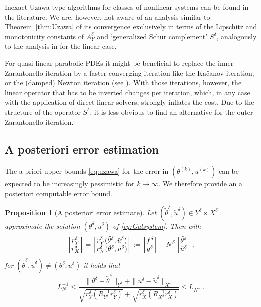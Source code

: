 \documentclass{amsart}
\newtheorem{proposition}[theorem]{Proposition}
\numberwithin{equation}{section}
\newcommand{\NN}{N}
\newcommand{\1}{\mathbb 1}
\begin{document}
\begin{remark} Inexact Uzawa type algorithms for classes of nonlinear systems can be found in the literature. We are, however, not aware of an analysis similar to Theorem~\ref{thm:Uzawa} of its convergence exclusively in terms of the Lipschitz and monotonicity constants of $A_Y^\delta$ and `generalized Schur complement' $S^\delta$, analogously to the analysis in \cite{34.67} for the linear case.
\end{remark}


\begin{remark} For quasi-linear parabolic PDEs it might be beneficial to replace the inner Zarantonello iteration by a faster converging iteration like the Ka\v{c}anov iteration, or the (damped) Newton iteration (see \cite{137,137.6}). With those iterations, however, the linear operator that has to be inverted changes per iteration, which, in any case with the application of direct linear solvers, strongly inflates the cost. Due to the structure of the operator $S^\delta$, it is less obvious to find an alternative for the outer Zarantonello iteration.
\end{remark}

\subsection{A posteriori error estimation}
The a priori upper bounds \eqref{eq:uzawa} for the error in $(\theta^{(k)},u^{(k)})$ can be expected to be increasingly pessimistic for $k \rightarrow \infty$.
We therefore provide an a posteriori computable error bound.


\begin{proposition}[A posteriori error estimate] \label{prop:3} Let $(\tilde{\theta}^\delta,\tilde{u}^\delta) \in Y^\delta \times X^\delta$ approximate the solution $(\theta^\delta,u^\delta)$ of \eqref{eq:Galsystem}. Then with
$$
\left[\begin{array}{@{}c@{}} r_Y^\delta \\ r_X^\delta \end{array}\right]
=\left[\begin{array}{@{}c@{}} r_Y^\delta(\tilde{\theta}^\delta,\tilde{u}^\delta)  \\ r_X^\delta(\tilde{\theta}^\delta,\tilde{u}^\delta)  \end{array}\right]
:=\left[\begin{array}{@{}c@{}} f^\delta \\ g^\delta \end{array}\right] -\NN^\delta \left[\begin{array}{@{}c@{}} \tilde{\theta}^\delta \\ \tilde{u}^\delta \end{array}\right],
$$
for $(\tilde{\theta}^\delta,\tilde{u}^\delta) \neq (\theta^\delta,u^\delta)$ it holds that
$$
L_N^{-1} \leq
 \frac{\|\theta^\delta-\tilde{\theta}^\delta\|_{Y^\delta}+\|u^\delta-\tilde{u}^\delta\|_{X^\delta}}
{\sqrt{r_Y^\delta(R_{Y^\delta}^{-1}r_Y^\delta)}+\sqrt{r_X^\delta(R_{X^\delta}^{-1}r_X^\delta)}} \leq L_{N^{-1}}.
$$
\end{proposition}
\end{document}
